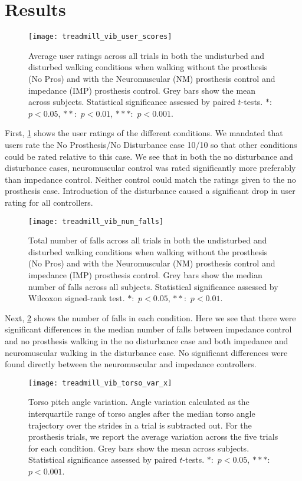 \section{Results}
\begin{figure}[t]
    \centering 
    \texttt{[image: treadmill\_vib\_user\_scores]}
    \caption[Average user ratings]{Average user ratings across
    all trials in both the undisturbed and disturbed walking conditions when
    walking without the prosthesis (No Pros) and with the Neuromuscular (NM)
    prosthesis control and impedance (IMP) prosthesis control. Grey bars show
    the mean across subjects.  Statistical significance assessed by paired
    $t$-tests. $*$:~$p < 0.05$, $**$:~$p < 0.01$, $***$:~$p <
    0.001$.}\label{fig:treadmill_user_ratings}
\end{figure}
First, \cref{fig:treadmill_user_ratings} shows the user ratings of the different
conditions. We mandated that users rate the No Prosthesis/No Disturbance case
10/10 so that other conditions could be rated relative to this case. We see that
in both the no disturbance and disturbance cases, neuromuscular control was
rated significantly more preferably than impedance control. Neither control
could match the ratings given to the no prosthesis case. Introduction of the
disturbance caused a significant drop in user rating for all controllers. 

\begin{figure}[b]
    \centering 
    \texttt{[image: treadmill\_vib\_num\_falls]}
    \caption[Total number of falls]{Total number of falls across all trials in
    both the undisturbed and disturbed walking conditions when walking without
    the prosthesis (No Pros) and with the Neuromuscular (NM) prosthesis control
    and impedance (IMP) prosthesis control. Grey bars show the median number of
    falls across all subjects. Statistical significance assessed by Wilcoxon
    signed-rank test.  $*$:~$p < 0.05$, $**$:~$p <
    0.01$.}\label{fig:treadmill_exp_falls}
\end{figure}
Next, \cref{fig:treadmill_exp_falls} shows the number of falls in each
condition. Here we see that there were significant differences in the median
number of falls between impedance control and no prosthesis walking in the no
disturbance case and both impedance and neuromuscular walking in the disturbance
case. No significant differences were found directly between the neuromuscular
and impedance controllers.

\begin{figure}[t]
    \centering 
    \texttt{[image: treadmill\_vib\_torso\_var\_x]}
    \caption[Torso pitch angle variation]{Torso pitch angle variation. Angle
    variation calculated as the interquartile range of torso angles after the
    median torso angle trajectory over the strides in a trial is subtracted out.
    For the prosthesis trials, we report the average variation across the five
    trials for each condition.  Grey bars show the mean across subjects.
    Statistical significance assessed by paired $t$-tests. $*$:~$p < 0.05$,
    $***$:~$p < 0.001$.}\label{fig:treadmill_exp_torso_var_x}
\end{figure}

